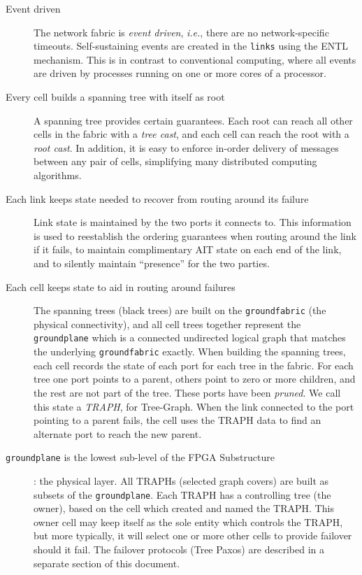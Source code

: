 \documentclass[../../../OAE-SPEC-MAIN.tex]{subfiles}
\begin{document}
\begin{description}
	\item [Event driven] The network fabric is \emph{event driven}, \emph{i.e.}, there are no network-specific timeouts. Self-sustaining events are created in the \texttt{links} using the ENTL mechanism. This is in contrast to conventional computing, where all events are driven by processes running on one or more cores of a processor.

	\item [Every cell builds a spanning tree with itself as root] A spanning tree provides certain guarantees.  Each root can reach all other cells in the fabric with a \emph{tree cast}, and each cell can reach the root with a \emph{root cast}.  In addition, it is easy to enforce in-order delivery of messages between any pair of cells, simplifying many distributed computing algorithms.

	\item [Each link keeps state needed to recover from routing around its failure] Link state is maintained by the two ports it connects to.  This information is used to reestablish the ordering guarantees when routing around the link if it fails, to maintain complimentary AIT state on each end of the link, and to silently maintain ``presence'' for the two parties.

	\item [Each cell keeps state to aid in routing around failures] The spanning trees (black trees) are built on the \texttt{groundfabric} (the physical connectivity), and all cell trees together represent the \texttt{groundplane} which is a connected undirected logical graph that matches the underlying \texttt{groundfabric} exactly.  When building the spanning trees, each cell records the state of each port for each tree in the fabric.  For each tree one port points to a parent, others point to zero or more children, and the rest are not part of the tree.   These ports have been \emph{pruned}.  We call this state a \emph{TRAPH}, for Tree-Graph.  When the link connected to the port pointing to a parent fails, the cell uses the TRAPH data to find an alternate port to reach the new parent.

	\item  [\texttt{groundplane} is the lowest sub-level of the FPGA Substructure]: the physical layer.
All TRAPHs (selected graph covers) are built as subsets of the \texttt{groundplane}. Each TRAPH has a controlling tree (the owner), based on the cell which created and named the TRAPH. This owner cell may keep itself as the sole entity which controls the TRAPH,  but more typically, it will select one or more other cells to provide failover should it fail. The failover protocols (Tree Paxos) are described in a separate section of this document.
	
\end{description}
\end{document}
